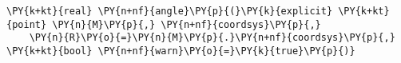 \begin{Verbatim}[commandchars=\\\{\}]
    \PY{k+kt}{real} \PY{n+nf}{angle}\PY{p}{(}\PY{k}{explicit} \PY{k+kt}{point} \PY{n}{M}\PY{p}{,} \PY{n+nf}{coordsys}\PY{p}{,}
    \PY{n}{R}\PY{o}{=}\PY{n}{M}\PY{p}{.}\PY{n+nf}{coordsys}\PY{p}{,} \PY{k+kt}{bool} \PY{n+nf}{warn}\PY{o}{=}\PY{k}{true}\PY{p}{)}
\end{Verbatim}
